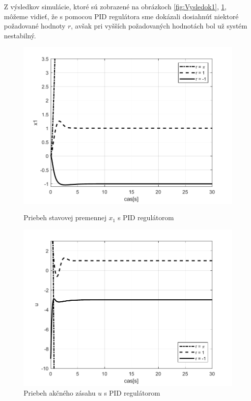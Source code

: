 \documentclass[../main.tex]{subfiles}
\begin{document}
Z výsledkov simulácie, ktoré sú zobrazené na obrázkoch \ref{fig:Vysledok1}, \ref{fig:Vysledok2}, môžeme vidieť, že s pomocou PID regulátora sme dokázali dosiahnúť niektoré požadované hodnoty $r$, avšak pri vyšších požadovaných hodnotách bol už systém nestabilný.
\begin{figure}[!htb]
   \begin{minipage}{0.46\textwidth}
     \centering
     \includegraphics[width=1\linewidth]{xpid.pdf}
     \caption{Priebeh stavovej premennej $x_1$ s PID regulátorom}
	\label{fig:Vysledok1}
   \end{minipage}\hfill
   \begin{minipage}{0.46\textwidth}
     \centering
     \includegraphics[width=1\linewidth]{upid.pdf}
     \caption{Priebeh akčného zásahu $u$ s PID regulátorom}
	\label{fig:Vysledok2}
   \end{minipage}
\end{figure}
\end{document}
